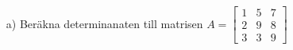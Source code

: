 \begin{itemize}
	\item[a) ] Beräkna determinanaten till matrisen $A=\begin{bmatrix}1 & 5 & 7\\ 2 & 9 & 8 \\ 3 & 3 & 9\end{bmatrix}$
\end{itemize}